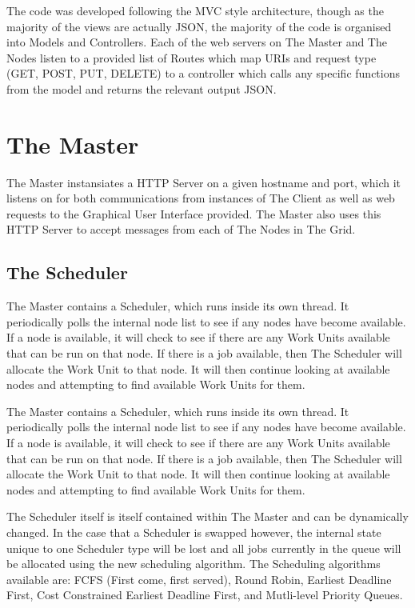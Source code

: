 The code was developed following the MVC style architecture, though as the majority of the views are actually JSON, the majority of the code is organised into Models and Controllers. Each of the web servers on The Master and The Nodes listen to a provided list of Routes which map URIs and request type (GET, POST, PUT, DELETE) to a controller which calls any specific functions from the model and returns the relevant output JSON.

\section{The Master}
The Master instansiates a HTTP Server on a given hostname and port, which it listens on for both communications from instances of The Client as well as web requests to the Graphical User Interface provided. The Master also uses this HTTP Server to accept messages from each of The Nodes in The Grid. 

\subsection{The Scheduler}
The Master contains a Scheduler, which runs inside its own thread. It periodically polls the internal node list to see if any nodes have become available. If a node is available, it will check to see if there are any Work Units available that can be run on that node. If there is a job available, then The Scheduler will allocate the Work Unit to that node. It will then continue looking at available nodes and attempting to find available Work Units for them.

The Master contains a Scheduler, which runs inside its own thread. It periodically polls the internal node list to see if any nodes have become available. If a node is available, it will check to see if there are any Work Units available that can be run on that node. If there is a job available, then The Scheduler will allocate the Work Unit to that node. It will then continue looking at available nodes and attempting to find available Work Units for them. 

The Scheduler itself is itself contained within The Master and can be dynamically changed. In the case that a Scheduler is swapped however, the internal state unique to one Scheduler type will be lost and all jobs currently in the queue will be allocated using the new scheduling algorithm. The Scheduling algorithms available are: FCFS (First come, first served), Round Robin, Earliest Deadline First, Cost Constrained Earliest Deadline First, and Mutli-level Priority Queues. 


